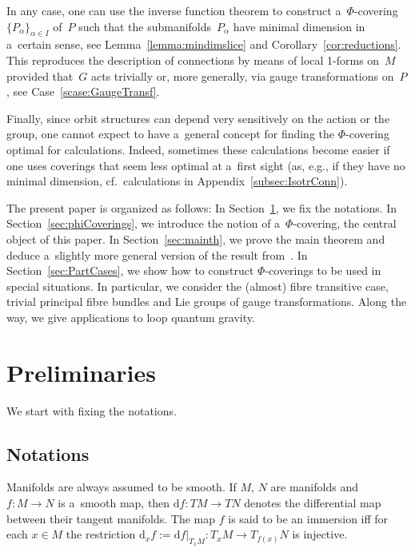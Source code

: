 \documentclass[pdftex]{sigma}
\numberwithin{equation}{section}
\begin{document}
In any case, one can use the inverse function theorem to construct a~$\Phi$-covering $\{P_\alpha\}_{\alpha\in I}$ of~$P$
such that the submanifolds~$P_\alpha$ have minimal dimension in a~certain sense, see Lemma~\ref{lemma:mindimslice} and Co\-rol\-la\-ry~\ref{cor:reductions}.
This reproduces the description of connections by means of local 1-forms on~$M$ provided that~$G$ acts trivially or,
more generally, via gauge transformations on~$P$, see Case~\ref{scase:GaugeTransf}.

Finally, since orbit structures can depend very sensitively on the action or the group, one cannot expect to have
a~general concept for f\/inding the $\Phi$-covering optimal for calculations.
Indeed, sometimes these calculations become easier if one uses coverings that seem less optimal at a~f\/irst sight (as, e.g., if they have no minimal dimension, cf.\ calculations in Appendix~\ref{subsec:IsotrConn}).

The present paper is organized as follows:
In Section~\ref{sec:prep}, we f\/ix the notations.
In Section~\ref{sec:phiCoverings}, we introduce the notion of a~$\Phi$-covering, the central object of this paper.
In Section~\ref{sec:mainth}, we prove the main theorem and deduce a~slightly more general version of the result from~\cite{HarSni}.
In Section~\ref{sec:PartCases}, we show how to construct $\Phi$-coverings to be used in special situations.
In particular, we consider the (almost) f\/ibre transitive case, trivial principal f\/ibre bundles and Lie groups of gauge
transformations.
Along the way, we give applications to loop quantum gravity.

\section{Preliminaries}\label{sec:prep}

We start with f\/ixing the notations.

\subsection{Notations}\label{sec:notations}

Manifolds are always assumed to be smooth.
If $M$, $N$ are manifolds and $f\colon M\rightarrow N$ is a~smooth map, then $\mathrm{d} f\colon TM\rightarrow TN$ denotes
the dif\/ferential map between their tangent manifolds.
The map $f$ is said to be an immersion if\/f for each $x\in M$ the restriction $\mathrm{d}_xf:=\mathrm{d} f|_{T_xM}\colon
T_xM\rightarrow T_{f(x)}N$ is injective.
\end{document}
